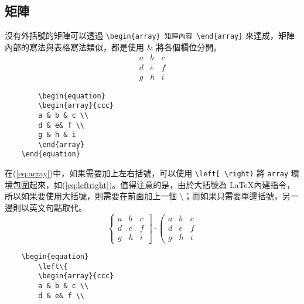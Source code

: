 \documentclass[12pt,a4paper]{report}
\begin{document}
\begin{CJK}{UTF8}{bkai}
\subsection{矩陣}
沒有外括號的矩陣可以透過 \verb|\begin{array} 矩陣內容 \end{array}| 來達成，矩陣內部的寫法與表格寫法類似，都是使用 \& 將各個欄位分開。
	\begin{equation}
		\begin{array}{ccc}
		a & b & c \\
		d & e& f \\
		g & h & i
		\end{array}
		\label{eq:array}
	\end{equation}
	
	\begin{framed}
	\begin{verbatim}
		\begin{equation}
		\begin{array}{ccc}
		a & b & c \\
		d & e& f \\
		g & h & i
		\end{array}
	\end{equation}
	\end{verbatim}
	\end{framed}
	在(\ref{eq:array})中，如果需要加上左右括號，可以使用 \verb|\left[ \right)| 將 \verb|array| 環境包圍起來，如(\ref{eq:leftright})。值得注意的是，由於大括號為 \LaTeX 內建指令，所以如果要使用大括號，則需要在前面加上一個 \textbackslash；而如果只需要單邊括號，另一邊則以英文句點取代。
	\begin{equation}
	\left\{
	\begin{array}{ccc}
	a & b & c \\
	d & e& f \\
	g & h & i
	\end{array}
	\right]
	\cdot
	\left(
	\begin{array}{ccc}
	a & b & c \\
	d & e& f \\
	g & h & i
	\end{array}
	\right. 
	\label{eq:leftright}
	\end{equation}
	\begin{framed}
	\begin{verbatim}
	\begin{equation}
		\left\{
		\begin{array}{ccc}
		a & b & c \\
		d & e& f \\

\end{verbatim}
\end{framed}
\end{CJK}
\end{document}
